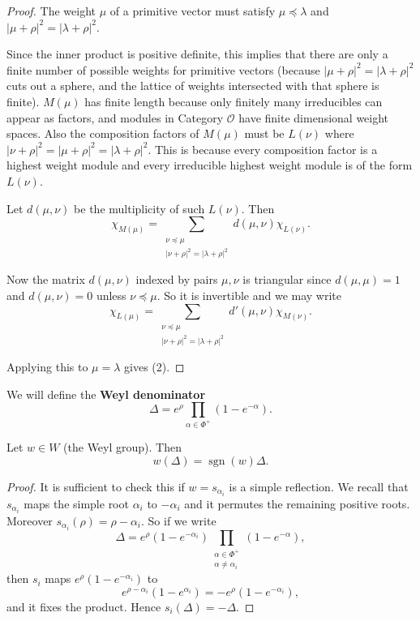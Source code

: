 \documentclass[12pt]{article}
\begin{document}
\begin{proof}
    The weight $\mu$ of a primitive vector must satisfy $\mu \preceq \lambda$ and
    $|\mu+\rho|^2 = |\lambda+\rho|^2$.

    Since the inner product is positive definite, this implies that there are only a finite number of possible weights for primitive vectors (because $|\mu+\rho|^2 = |\lambda+\rho|^2 $ cuts out a sphere, and the lattice of weights intersected with that sphere is finite). $M(\mu)$ has finite length because only finitely many irreducibles can appear as factors, and modules in Category $\mathcal{O}$ have finite dimensional weight spaces. Also the composition factors of $M(\mu)$ must be $L(\nu)$ where $|\nu+\rho|^2 = |\mu+\rho|^2 = |\lambda+\rho|^2$. This is because every composition factor is a highest weight module and every irreducible highest weight module is of the form $L(\nu)$.

    Let $d(\mu,\nu)$ be the multiplicity of such $L(\nu)$. Then
    \[
        \chi_{M(\mu)} = \sum_{\substack{\nu \preceq \mu \\ |\nu+\rho|^2 = |\lambda+\rho|^2}}
        d(\mu,\nu)\chi_{L(\nu)}.
    \]

    Now the matrix $d(\mu,\nu)$ indexed by pairs $\mu,\nu$ is triangular since
    $d(\mu,\mu) = 1$ and $d(\mu,\nu) = 0$ unless $\nu \preceq \mu$. So it is invertible and we may write
    \[
        \chi_{L(\mu)} = \sum_{\substack{\nu \preceq \mu \\ |\nu+\rho|^2 = |\lambda+\rho|^2}}
        d'(\mu,\nu)\chi_{M(\nu)}.
    \]

    Applying this to $\mu = \lambda$ gives (2).
\end{proof}

We will define the \textbf{Weyl denominator}
\[
    \Delta = e^\rho \prod_{\alpha \in \Phi^+} (1 - e^{-\alpha}).
\]

\begin{lemma}
    Let $w \in W$ (the Weyl group). Then
    \[
        w(\Delta) = \operatorname{sgn}(w)\Delta.
    \]
\end{lemma}

\begin{proof}
    It is sufficient to check this if $w = s_{\alpha_i}$ is a simple reflection. We recall that
    $s_{\alpha_i}$ maps the simple root $\alpha_i$ to $-\alpha_i$ and it permutes the remaining
    positive roots. Moreover $s_{\alpha_i}(\rho) = \rho - \alpha_i$. So if we write
    \[
        \Delta = e^\rho (1 - e^{-\alpha_i}) \prod_{\substack{\alpha \in \Phi^+ \\ \alpha \neq \alpha_i}}
        (1 - e^{-\alpha}),
    \]
    then $s_i$ maps $e^\rho (1 - e^{-\alpha_i})$ to
    \[
        e^{\rho-\alpha_i}(1 - e^{\alpha_i}) = - e^\rho (1 - e^{-\alpha_i}),
    \]
    and it fixes the product. Hence $s_i(\Delta) = -\Delta$.
\end{proof}
\end{document}
